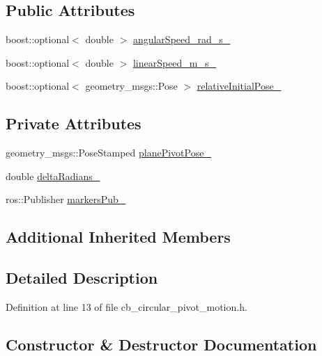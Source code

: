 \subsection*{Public Attributes}
\begin{DoxyCompactItemize}
\item 
boost\+::optional$<$ double $>$ \hyperlink{classcl__move__group__interface_1_1CbCircularPivotMotion_a39fa383804d82285e07fa1c5a37cc587}{angular\+Speed\+\_\+rad\+\_\+s\+\_\+}
\item 
boost\+::optional$<$ double $>$ \hyperlink{classcl__move__group__interface_1_1CbCircularPivotMotion_adf6f6bc7a7a55f5c3dff80475e33c2e3}{linear\+Speed\+\_\+m\+\_\+s\+\_\+}
\item 
boost\+::optional$<$ geometry\+\_\+msgs\+::\+Pose $>$ \hyperlink{classcl__move__group__interface_1_1CbCircularPivotMotion_a1b2cc65d2f27a4dec54c20f1f00d4bb8}{relative\+Initial\+Pose\+\_\+}
\end{DoxyCompactItemize}
\subsection*{Private Attributes}
\begin{DoxyCompactItemize}
\item 
geometry\+\_\+msgs\+::\+Pose\+Stamped \hyperlink{classcl__move__group__interface_1_1CbCircularPivotMotion_a0994efbe93b9f9a61fcf3703c360cda2}{plane\+Pivot\+Pose\+\_\+}
\item 
double \hyperlink{classcl__move__group__interface_1_1CbCircularPivotMotion_afade33f1182615c64ea972075bfd2b95}{delta\+Radians\+\_\+}
\item 
ros\+::\+Publisher \hyperlink{classcl__move__group__interface_1_1CbCircularPivotMotion_aee2c9918b0e0609e0201dc1219091938}{markers\+Pub\+\_\+}
\end{DoxyCompactItemize}
\subsection*{Additional Inherited Members}


\subsection{Detailed Description}


Definition at line 13 of file cb\+\_\+circular\+\_\+pivot\+\_\+motion.\+h.



\subsection{Constructor \& Destructor Documentation}
\mbox{\label{classcl__move__group__interface_1_1CbCircularPivotMotion_adc0d93cb33df529d6a1e277fed25ceb1}} 
